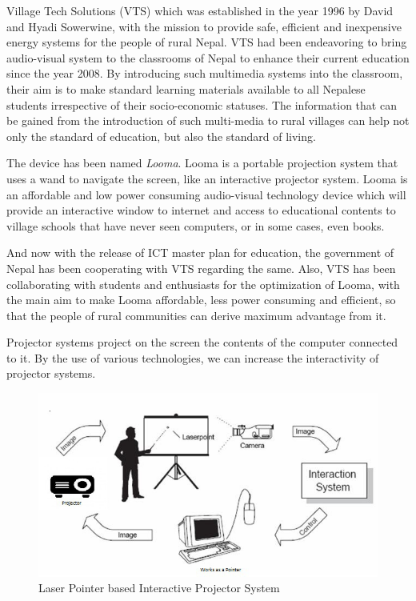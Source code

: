 \documentclass[12pt, a4paper]{article}
\begin{document}
Village Tech Solutions (VTS) which was established in the year 1996 by David and Hyadi Sowerwine, with the mission to provide safe, efficient and inexpensive energy systems for the people of rural Nepal. VTS had been endeavoring to bring audio-visual system to the classrooms of Nepal to enhance their current education since the year 2008. By introducing such multimedia systems into the classroom, their aim is to make standard learning materials available to all Nepalese students irrespective of their socio-economic statuses. The information that can be gained from the introduction of such multi-media to rural villages can help not only the
standard of education, but also the standard of living. 

The device has been named \emph {Looma}. Looma is a portable projection system that uses a wand to navigate the screen, like an interactive projector system. Looma is an affordable and low power consuming audio-visual technology device which will provide an interactive window to internet and access to educational contents to village schools that have never seen computers, or in some cases, even books.

And now with the release of ICT master plan for education, the government
of Nepal has been cooperating with VTS regarding the same. Also, VTS
has been collaborating with students and enthusiasts for the optimization of
Looma, with the main aim to make Looma affordable, less power consuming
and efficient, so that the people of rural communities can derive maximum
advantage from it.

Projector systems project on the screen the contents of the computer connected to it. By the use of various technologies, we can increase the interactivity of projector systems. 

\begin{figure}[h]
\centering
\includegraphics[scale=0.7]{abc}
\caption {Laser Pointer based Interactive Projector System}
\end{figure}
\end{document}

